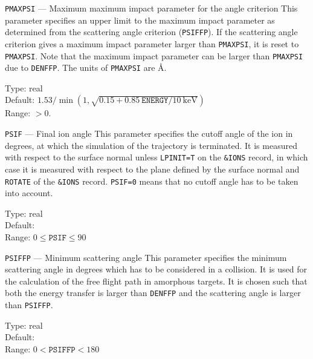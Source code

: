 \begin{keydescription}{\texttt{PMAXPSI} --- Maximum maximum impact
    parameter for the angle criterion}
%
  This parameter specifies an upper limit to the maximum impact
  parameter as determined from the scattering angle criterion
  (\texttt{PSIFFP}).  If the scattering angle criterion gives a
  maximum impact parameter larger than \texttt{PMAXPSI}, it is reset
  to \texttt{PMAXPSI}. Note that the maximum impact parameter can be
  larger than \texttt{PMAXPSI} due to {\tt DENFFP}. 
  The units of \texttt{PMAXPSI} are \AA.  
  \begin{keytab}
    Type:    \> real \\
    Default: \> $1.53 / \min( 1,
                 \sqrt{0.15+0.85~\texttt{ENERGY}/10~\mathrm{keV}} )$ \\
    Range:   \> $>0$.
  \end{keytab}
\end{keydescription}

\begin{keydescription}{\texttt{PSIF} --- Final ion angle}
%
  This parameter specifies the cutoff angle of the ion in degrees, at
  which the simulation of the trajectory is terminated. It is measured
  with respect to the surface normal unless \texttt{LPINIT=T} on the
  \texttt{\&IONS} record, in which case it is measured with respect to
  the plane defined by the surface normal and \texttt{ROTATE} of the
  \texttt{\&IONS} record.  \texttt{PSIF=0} means that no cutoff angle
  has to be taken into account.
  \begin{keytab}
    Type:    \> real \\
    Default:  \\
    Range:   \> $0 \le \texttt{PSIF} \le 90$
  \end{keytab}
\end{keydescription}

\begin{keydescription}{\texttt{PSIFFP} --- Minimum scattering angle}
%
  This parameter specifies the minimum scattering angle in degrees which has
  to be considered in a collision. It is used for the calculation of the 
  free flight path in amorphous targets. It is chosen such that both 
  the energy transfer is larger than \texttt{DENFFP} and the scattering angle
  is larger than \texttt{PSIFFP}.
  \begin{keytab}
    Type:    \> real \\
    Default:  \\
    Range:   \> $0 < \texttt{PSIFFP} < 180$
  \end{keytab}
\end{keydescription}

